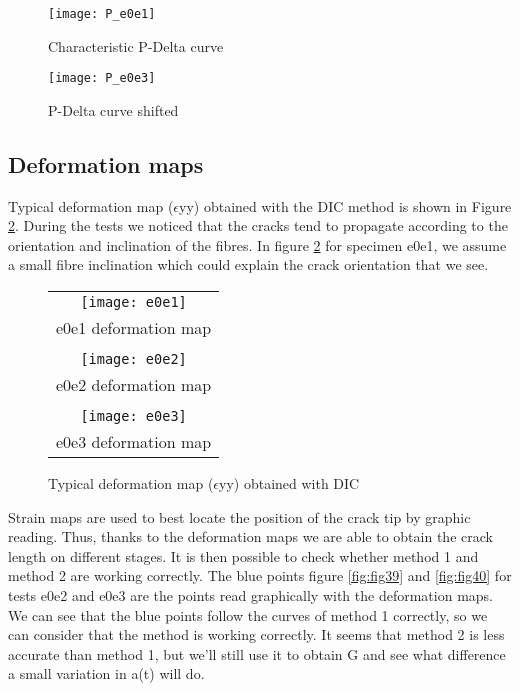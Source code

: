 \begin{figure}[htp]
	\begin{minipage}[c]{.46\linewidth}
		\centering
		\texttt{[image: P\_e0e1]}
		\caption{Characteristic P-Delta curve}
		\label{fig:e0e1_Pdelta}
	\end{minipage}
	\hfill%
	\begin{minipage}[c]{.46\linewidth}
		\centering
		\texttt{[image: P\_e0e3]}
		\caption{P-Delta curve shifted}
		\label{fig:e0e5_Pdelta}
	\end{minipage}
\end{figure}


\subsection{Deformation maps}

Typical deformation map ($\epsilon$yy) obtained with the DIC method is shown in Figure \ref{fig:Strain_def}.
During the tests we noticed that the cracks tend to propagate according to the orientation and inclination of the fibres.
In figure \ref{fig:Strain_def} for specimen e0e1, we assume a small fibre inclination which could explain the crack orientation that we see.

\begin{figure}[htp]
	\centering
	\begin{tabular}{c}
		\texttt{[image: e0e1]} \\
		e0e1 deformation map \\
		\\
		\texttt{[image: e0e2]} \\
		e0e2 deformation map \\
		\\
		\texttt{[image: e0e3]} \\
		e0e3 deformation map \\
	\end{tabular}
	\caption{Typical deformation map ($\epsilon$yy) obtained with DIC}
	\label{fig:Strain_def}
\end{figure}

Strain maps are used to best locate the position of the crack tip by graphic reading.
Thus, thanks to the deformation maps we are able to obtain the crack length on different stages. It is then possible to check whether method 1 and method 2 are working correctly.
The blue points figure \ref{fig:fig39} and \ref{fig:fig40} for tests e0e2 and e0e3 are the points read graphically with the deformation maps. We can see that the blue points follow the curves of method 1 correctly, so we can consider that the method is working correctly. 
It seems that method 2 is less accurate than method 1, but we'll still use it to obtain G and see what difference a small variation in a(t) will do.

